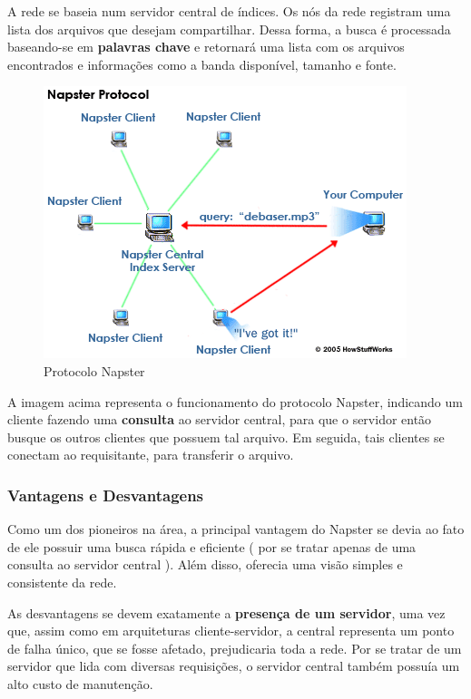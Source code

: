 \documentclass[a4paper]{article}
\begin{document}
A rede se baseia num servidor central de índices. Os nós da rede registram uma lista dos arquivos que desejam compartilhar. Dessa forma, a busca é processada baseando-se em \textbf{palavras chave} e retornará uma lista com os arquivos encontrados e informações como a banda disponível, tamanho e fonte. 

\begin{figure}[!h]
\begin{center}
  \includegraphics{img//ilustracaoiot.png} 
  \caption{Protocolo Napster \cite{howstuffworks} \label{figure1}}
\end{center}
\end{figure}

A imagem acima representa o funcionamento do protocolo Napster, indicando um cliente fazendo uma \textbf{consulta} ao servidor central, para que o servidor então busque os outros clientes que possuem tal arquivo. Em seguida, tais clientes se conectam ao requisitante, para transferir o arquivo.

\subsubsection{Vantagens e Desvantagens}
Como um dos pioneiros na área, a principal vantagem do Napster se devia ao fato de ele possuir uma busca rápida e eficiente ( por se tratar apenas de uma consulta ao servidor central ). Além disso, oferecia uma visão simples e consistente da rede. 

As desvantagens se devem exatamente a \textbf{presença de um servidor}, uma vez que, assim como em arquiteturas cliente-servidor, a central representa um ponto de falha único, que se fosse afetado, prejudicaria toda a rede. Por se tratar de um servidor que lida com diversas requisições, o servidor central também possuía um alto custo de manutenção.
\end{document}
